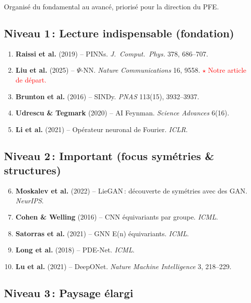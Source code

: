 \documentclass[11pt,a4paper]{article}
\begin{document}
Organisé du fondamental au avancé, priorisé pour la direction du PFE.

\subsection{Niveau 1\,: Lecture indispensable (fondation)}

\begin{enumerate}[leftmargin=1.8em,itemsep=3pt]
\item \textbf{Raissi et al.} (2019) -- PINNs. \textit{J.\ Comput.\ Phys.} 378, 686--707.
\item \textbf{Liu et al.} (2025) -- $\Psi$-NN. \textit{Nature Communications} 16, 9558. \textcolor{red}{$\star$ Notre article de départ.}
\item \textbf{Brunton et al.} (2016) -- SINDy. \textit{PNAS} 113(15), 3932--3937.
\item \textbf{Udrescu \& Tegmark} (2020) -- AI Feynman. \textit{Science Advances} 6(16).
\item \textbf{Li et al.} (2021) -- Opérateur neuronal de Fourier. \textit{ICLR}.
\end{enumerate}

\subsection{Niveau 2\,: Important (focus symétries \& structures)}

\begin{enumerate}[leftmargin=1.8em,itemsep=3pt]
\setcounter{enumi}{5}
\item \textbf{Moskalev et al.} (2022) -- LieGAN\,: découverte de symétries avec des GAN. \textit{NeurIPS}.
\item \textbf{Cohen \& Welling} (2016) -- CNN équivariants par groupe. \textit{ICML}.
\item \textbf{Satorras et al.} (2021) -- GNN E(n) équivariants. \textit{ICML}.
\item \textbf{Long et al.} (2018) -- PDE-Net. \textit{ICML}.
\item \textbf{Lu et al.} (2021) -- DeepONet. \textit{Nature Machine Intelligence} 3, 218--229.
\end{enumerate}

\subsection{Niveau 3\,: Paysage élargi}
\end{document}
